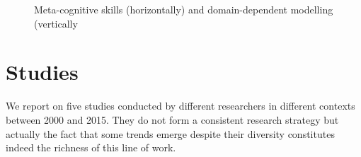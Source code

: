 \documentclass[natbib]{svjour3}
\newcommand{\Model}[3]{{$\mathcal{M}^{\circ}(#1, #2, #3)$}}
\begin{document}
\begin{figure}[htb]
\centering


\caption{\small Meta-cognitive skills (horizontally) and domain-dependent modelling (vertically}

\label{mm_rectangle}
\end{figure}






\section{Studies}

We report on five studies conducted  by different researchers in different contexts
between 2000 and 2015. They do not form a consistent research strategy but
actually the fact that some trends emerge despite their diversity constitutes
indeed the richness of this line of work.
\end{document}
